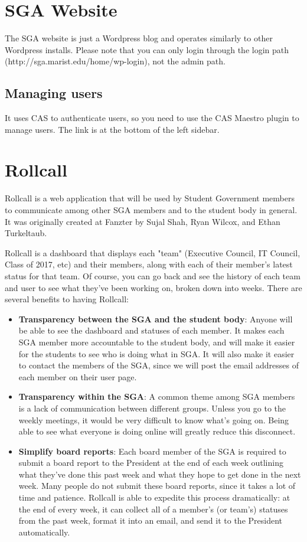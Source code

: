 \documentclass[11pt]{report}
\begin{document}
	\section{SGA Website}
		The SGA website is just a Wordpress blog and operates similarly to other Wordpress installs. Please note that you can only login through the login path (http://sga.marist.edu/home/wp-login), not the admin path.
		
		\subsection{Managing users}
			It uses CAS to authenticate users, so you need to use the CAS Maestro plugin to manage users. The link is at the bottom of the left sidebar.

	\section{Rollcall}
		Rollcall is a web application that will be used by Student Government members to communicate among other SGA members and to the student body in general. It was originally created at Fanzter by Sujal Shah, Ryan Wilcox, and Ethan Turkeltaub.

		Rollcall is a dashboard that displays each "team" (Executive Council, IT Council, Class of 2017, etc) and their members, along with each of their member’s latest status for that team. Of course, you can go back and see the history of each team and user to see what they've been working on, broken down into weeks. There are several benefits to having Rollcall:

		\begin{itemize}
			\item{\textbf{Transparency between the SGA and the student body}: Anyone will be able to see the dashboard and statuses of each member. It makes each SGA member more accountable to the student body, and will make it easier for the students to see who is doing what in SGA. It will also make it easier to contact the members of the SGA, since we will post the email addresses of each member on their user page.}
			\item{\textbf{Transparency within the SGA}: A common theme among SGA members is a lack of communication between different groups. Unless you go to the weekly meetings, it would be very difficult to know what’s going on. Being able to see what everyone is doing online will greatly reduce this disconnect.}
			\item{\textbf{Simplify board reports}: Each board member of the SGA is required to submit a board report to the President at the end of each week outlining what they’ve done this past week and what they hope to get done in the next week. Many people do not submit these board reports, since it takes a lot of time and patience. Rollcall is able to expedite this process dramatically: at the end of every week, it can collect all of a member’s (or team’s) statuses from the past week, format it into an email, and send it to the President automatically.}
		\end{itemize}
\end{document}
